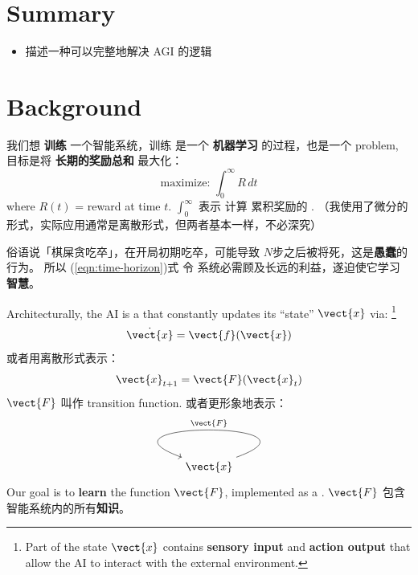 \section*{Summary}
\begin{itemize}
	\item 描述一种可以完整地解决 AGI 的逻辑
\end{itemize}

\tableofcontents


\section{Background}

我们想 \textbf{训练} 一个智能系统，训练 是一个 \textbf{机器学习} 的过程，也是一个  problem, 目标是将 \textbf{长期的奖励总和} 最大化：
\begin{equation}
\label{eqn:time-horizon}
\mbox{maximize: } \int_0^{\infty} R \, dt
\end{equation}
where $R(t)$ = reward at time $t$.  $\int_0^{\infty}$ 表示 计算 累积奖励的 .  （我使用了微分的形式，实际应用通常是离散形式，但两者基本一样，不必深究）

俗语说「棋屎贪吃卒」，在开局初期吃卒，可能导致 $N$步之后被将死，这是\textbf{愚蠢}的行为。 所以 (\ref{eqn:time-horizon})式 令 系统必需顾及长远的利益，遂迫使它学习 \textbf{智慧}。

Architecturally, the AI is a  that constantly updates its ``state'' $\vect{x}$ via: \footnote{Part of the state $\vect{x}$ contains \textbf{sensory input} and \textbf{action output} that allow the AI to interact with the external environment.}
\begin{equation}
\dot{\vect{x}} = \vect{f}(\vect{x})
\end{equation}
或者用离散形式表示：
\begin{equation}
\vect{x}_{t+1} = \vect{F}(\vect{x}_t)
\end{equation}
$\vect{F}$ 叫作 transition function.  或者更形象地表示：
\begin{equation}
\label{eqn:AGI-architecture}
\begin{tikzcd}
\vect{x} \arrow[in=160,out=20,loop,looseness=5,swap,"\vect{F}"]
\end{tikzcd}
\end{equation}
Our goal is to \textbf{learn} the function $\vect{F}$, implemented as a .  $\vect{F}$ 包含智能系统内的所有\textbf{知识}。 

